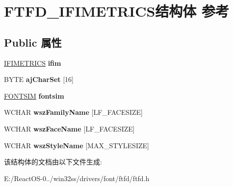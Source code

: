 \hypertarget{struct_f_t_f_d___i_f_i_m_e_t_r_i_c_s}{}\section{F\+T\+F\+D\+\_\+\+I\+F\+I\+M\+E\+T\+R\+I\+C\+S结构体 参考}
\label{struct_f_t_f_d___i_f_i_m_e_t_r_i_c_s}
\subsection*{Public 属性}
\begin{DoxyCompactItemize}
\item 
\mbox{\label{struct_f_t_f_d___i_f_i_m_e_t_r_i_c_s_a151f9278f74b1fa76d5ddd395de36268}} 
\hyperlink{struct___i_f_i_m_e_t_r_i_c_s}{I\+F\+I\+M\+E\+T\+R\+I\+CS} {\bfseries ifim}
\item 
\mbox{\label{struct_f_t_f_d___i_f_i_m_e_t_r_i_c_s_a816e6b2ca477bded020a40dc558c2f01}} 
B\+Y\+TE {\bfseries aj\+Char\+Set} \mbox{[}16\mbox{]}
\item 
\mbox{\label{struct_f_t_f_d___i_f_i_m_e_t_r_i_c_s_a0a5ece8a867157a1f84733ff90f2f5b1}} 
\hyperlink{struct___f_o_n_t_s_i_m}{F\+O\+N\+T\+S\+IM} {\bfseries fontsim}
\item 
\mbox{\label{struct_f_t_f_d___i_f_i_m_e_t_r_i_c_s_a0f3c5b9399e16a5b6f8cfae084b4f58c}} 
W\+C\+H\+AR {\bfseries wsz\+Family\+Name} \mbox{[}L\+F\+\_\+\+F\+A\+C\+E\+S\+I\+ZE\mbox{]}
\item 
\mbox{\label{struct_f_t_f_d___i_f_i_m_e_t_r_i_c_s_a9fcb9756917a146b98a373982d071167}} 
W\+C\+H\+AR {\bfseries wsz\+Face\+Name} \mbox{[}L\+F\+\_\+\+F\+A\+C\+E\+S\+I\+ZE\mbox{]}
\item 
\mbox{\label{struct_f_t_f_d___i_f_i_m_e_t_r_i_c_s_a7377af837d36558f93cec85c4ecd762f}} 
W\+C\+H\+AR {\bfseries wsz\+Style\+Name} \mbox{[}M\+A\+X\+\_\+\+S\+T\+Y\+L\+E\+S\+I\+ZE\mbox{]}
\end{DoxyCompactItemize}


该结构体的文档由以下文件生成\+:\begin{DoxyCompactItemize}
\item 
E\+:/\+React\+O\+S-\/0../win32ss/drivers/font/ftfd/ftfd.\+h\end{DoxyCompactItemize}

